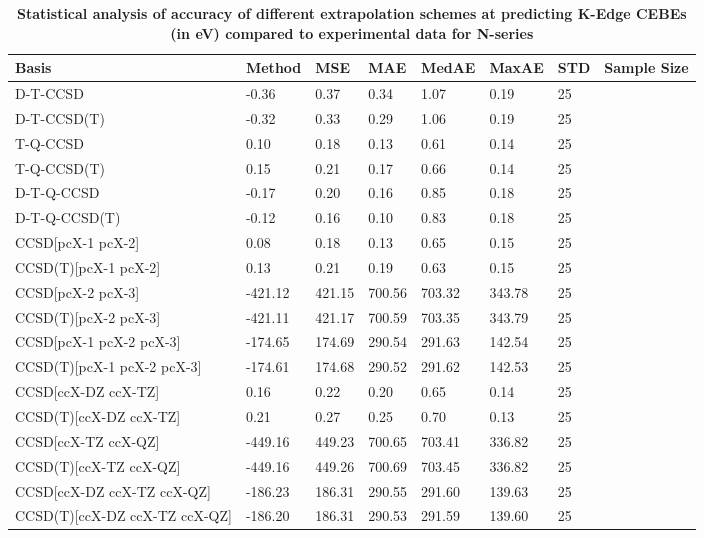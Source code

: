 \begin{table}
  \caption{\textbf{Statistical analysis of accuracy of different extrapolation schemes at predicting K-Edge CEBEs (in eV) compared to experimental data for N-series}}
  \label{tbl:extrap-scheme-summary-n}
  \begin{tabular}{l l l l l l l l }
    \toprule
    \textbf{Basis} & \textbf{Method} & \textbf{MSE} & \textbf{MAE} & \textbf{MedAE} & \textbf{MaxAE} & \textbf{STD} & \textbf{Sample Size} \\ 
    \midrule
    D-T-CCSD & -0.36 & 0.37 & 0.34 & 1.07 & 0.19 & 25 \\ 
    D-T-CCSD(T) & -0.32 & 0.33 & 0.29 & 1.06 & 0.19 & 25 \\ 
    T-Q-CCSD & 0.10 & 0.18 & 0.13 & 0.61 & 0.14 & 25 \\ 
    T-Q-CCSD(T) & 0.15 & 0.21 & 0.17 & 0.66 & 0.14 & 25 \\ 
    D-T-Q-CCSD & -0.17 & 0.20 & 0.16 & 0.85 & 0.18 & 25 \\ 
    D-T-Q-CCSD(T) & -0.12 & 0.16 & 0.10 & 0.83 & 0.18 & 25 \\ 
    CCSD[pcX-1 pcX-2] & 0.08 & 0.18 & 0.13 & 0.65 & 0.15 & 25 \\ 
    CCSD(T)[pcX-1 pcX-2] & 0.13 & 0.21 & 0.19 & 0.63 & 0.15 & 25 \\ 
    CCSD[pcX-2 pcX-3] & -421.12 & 421.15 & 700.56 & 703.32 & 343.78 & 25 \\ 
    CCSD(T)[pcX-2 pcX-3] & -421.11 & 421.17 & 700.59 & 703.35 & 343.79 & 25 \\ 
    CCSD[pcX-1 pcX-2 pcX-3] & -174.65 & 174.69 & 290.54 & 291.63 & 142.54 & 25 \\ 
    CCSD(T)[pcX-1 pcX-2 pcX-3] & -174.61 & 174.68 & 290.52 & 291.62 & 142.53 & 25 \\ 
    CCSD[ccX-DZ ccX-TZ] & 0.16 & 0.22 & 0.20 & 0.65 & 0.14 & 25 \\ 
    CCSD(T)[ccX-DZ ccX-TZ] & 0.21 & 0.27 & 0.25 & 0.70 & 0.13 & 25 \\ 
    CCSD[ccX-TZ ccX-QZ] & -449.16 & 449.23 & 700.65 & 703.41 & 336.82 & 25 \\ 
    CCSD(T)[ccX-TZ ccX-QZ] & -449.16 & 449.26 & 700.69 & 703.45 & 336.82 & 25 \\ 
    CCSD[ccX-DZ ccX-TZ ccX-QZ] & -186.23 & 186.31 & 290.55 & 291.60 & 139.63 & 25 \\ 
    CCSD(T)[ccX-DZ ccX-TZ ccX-QZ] & -186.20 & 186.31 & 290.53 & 291.59 & 139.60 & 25 \\ 
    \bottomrule
  \end{tabular}
\end{table}
